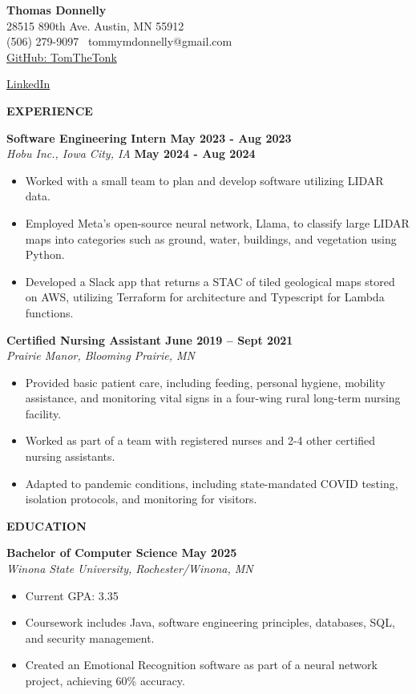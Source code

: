 \textbf{Thomas Donnelly}\\
28515 890th Ave. \textbar{} Austin, MN 55912\\
(506) 279-9097 \textbar~tommymdonnelly@gmail.com\\
\href{https://github.com/TomTheTonk}{GitHub: TomTheTonk}

\href{https://www.linkedin.com/in/thomas-donnelly-429405320/}{LinkedIn}

\textbf{EXPERIENCE}

\textbf{Software Engineering Intern May 2023 - Aug 2023}\\
\emph{Hobu Inc., Iowa City, IA} \textbf{May 2024 - Aug 2024}

\begin{itemize}
\item
  Worked with a small team to plan and develop software utilizing LIDAR
  data.
\item
  Employed Meta's open-source neural network, Llama, to classify large
  LIDAR maps into categories such as ground, water, buildings, and
  vegetation using Python.
\item
  Developed a Slack app that returns a STAC of tiled geological maps
  stored on AWS, utilizing Terraform for architecture and Typescript for
  Lambda functions.
\end{itemize}

\textbf{Certified Nursing Assistant June 2019 -- Sept 2021}\\
\emph{Prairie Manor, Blooming Prairie, MN}

\begin{itemize}
\item
  Provided basic patient care, including feeding, personal hygiene,
  mobility assistance, and monitoring vital signs in a four-wing rural
  long-term nursing facility.
\item
  Worked as part of a team with registered nurses and 2-4 other
  certified nursing assistants.
\item
  Adapted to pandemic conditions, including state-mandated COVID
  testing, isolation protocols, and monitoring for visitors.
\end{itemize}

\textbf{EDUCATION}

\textbf{Bachelor of Computer Science May 2025}\\
\emph{Winona State University, Rochester/Winona, MN}

\begin{itemize}
\item
  Current GPA: 3.35
\item
  Coursework includes Java, software engineering principles, databases,
  SQL, and security management.
\item
  Created an Emotional Recognition software as part of a neural network
  project, achieving 60\% accuracy.
\end{itemize}

